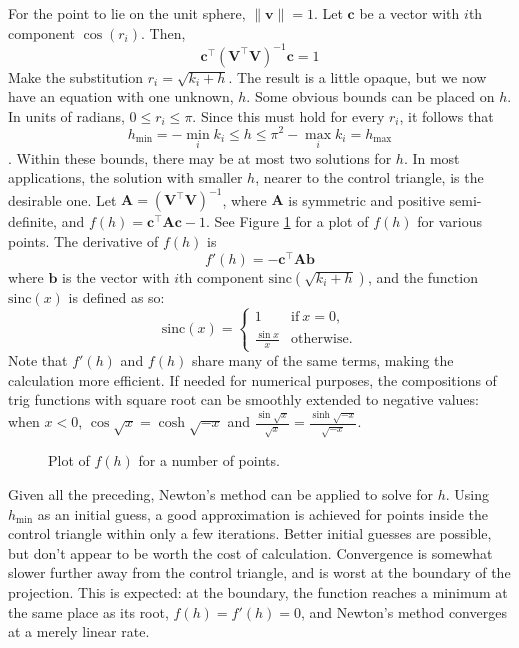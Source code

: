 \documentclass{amsart}[12pt]
\begin{document}
For the point to lie on the unit sphere, $\|\mathbf v\| = 1$. Let $\mathbf c$
be a vector with $i$th component $\cos\left(r_i \right)$. Then,
\begin{equation}
  \mathbf c^\top \left(\mathbf V^\top \mathbf V\right )^{-1} \mathbf c = 1
\end{equation}
Make the substitution $r_i = \sqrt{k_i + h}$. The result is a little opaque,
but we now have an equation with one unknown, $h$. Some obvious bounds can be
placed on $h$. In units of radians, $0 \le r_i \le \pi$. Since this must hold
for every $r_i$, it follows that
$$
h_{\min} = -\min_i k_i \le h \le \pi^2 - \max_i k_i = h_{\max}
$$.
Within these bounds, there may be at most two solutions for $h$. In most
applications, the solution with smaller $h$, nearer to the control triangle, is
the desirable one. Let
$\mathbf A = \left(\mathbf V^\top \mathbf V\right )^{-1}$,
where $\mathbf A$ is symmetric and positive semi-definite, and
$f(h) = \mathbf c^\top \mathbf A \mathbf c - 1$. See Figure \ref{fig:fh} for a
plot of $f(h)$ for various points.
The derivative of $f(h)$ is
\begin{equation}
  f'(h) = -\mathbf c^\top \mathbf A \mathbf b
\end{equation}
where $\mathbf b$ is the vector with $i$th component
$\mathrm{sinc}\left(\sqrt{k_i + h}\right)$, and the function $\mathrm{sinc} (x)$
is defined as so:
\begin{equation}
\mathrm{sinc} (x) = \begin{cases}
      1 & \text{if}\ x=0, \\
      \frac{\sin x}{x} & \text{otherwise}.
    \end{cases}
\end{equation}
Note that $f'(h)$ and $f(h)$ share many of the same terms, making the
calculation more efficient. If needed for numerical purposes, the compositions
of trig functions with square root can be smoothly extended to negative values:
when $x<0$, $\cos \sqrt{x} = \cosh \sqrt{-x}$
and $\frac{\sin \sqrt{x}}{\sqrt{x}} = \frac{\sinh \sqrt{-x}}{\sqrt{-x}}$.

\begin{figure}%

\caption{Plot of $f(h)$ for a number of points.}
\label{fig:fh}
\end{figure}

Given all the preceding, Newton's method can be applied to solve for $h$.
Using $h_{\min}$ as an initial guess, a good approximation is achieved for
points inside the control triangle within only a few iterations. Better initial
guesses are possible, but don't appear to be worth the cost of calculation.
Convergence is somewhat slower further away from the control triangle, and is
worst at the boundary of the projection. This is expected: at the boundary, the
function reaches a minimum at the same place as its root, $f(h)=f'(h)=0$, and
Newton's method converges at a merely linear rate.\cite{burden}
\end{document}
